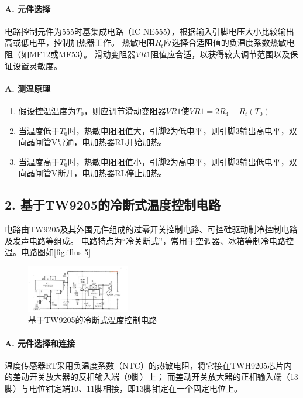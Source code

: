 \documentclass[12pt,a4paper,UTF8]{ctexart}
\begin{document}
        \paragraph{A. 元件选择} 
        电路控制元件为555时基集成电路（IC NE555），根据输入引脚电压大小比较输出高或低电平，控制加热器工作。
        热敏电阻$R_t$应选择合适阻值的负温度系数热敏电阻（如MF12或MF53）。
        滑动变阻器$VR1$阻值应合适，以获得较大调节范围以及保证设置灵敏度。
        \paragraph{A. 测温原理}
        \begin{enumerate}[label=\arabic*.]
            \item 假设控温温度为$T_0$，则应调节滑动变阻器$VR1$使$VR1 = 2R_4 - R_t(T_0)$
            \item 当温度低于$T_0$时，热敏电阻阻值大，引脚2为低电平，则引脚3输出高电平，双向晶闸管V导通，电加热器RL开始加热。
            \item 当温度高于$T_0$时，热敏电阻阻值小，引脚2为高电平，则引脚3输出低电平，双向晶闸管V断开，电加热器RL停止加热。
        \end{enumerate}
    \subsection*{2. 基于TW9205的冷断式温度控制电路}
    电路由TW9205及其外围元件组成的过零开关控制电路、可控硅驱动制冷控制电路及发声电路等组成。
    电路特点为“冷关断式”，常用于空调器、冰箱等制冷电路控温。电路图如\ref{fig:illus-5}
    \begin{figure}[htbp]
        \centering
        \includegraphics[width=0.4\textwidth]{attachments/illus-6.jpg}
        \caption{基于TW9205的冷断式温度控制电路}
        \label{fig:illus-6}
    \end{figure}
    \paragraph{A. 元件选择和连接} 
    温度传感器RT采用负温度系数（NTC）的热敏电阻，将它接在TWH9205芯片内的差动开关放大器的反相输入端（9脚）上；
    而差动开关放大器的正相输入端（13脚）与电位钳定端10、11脚相接，即13脚钳定在一个固定电位上。
\end{document}
